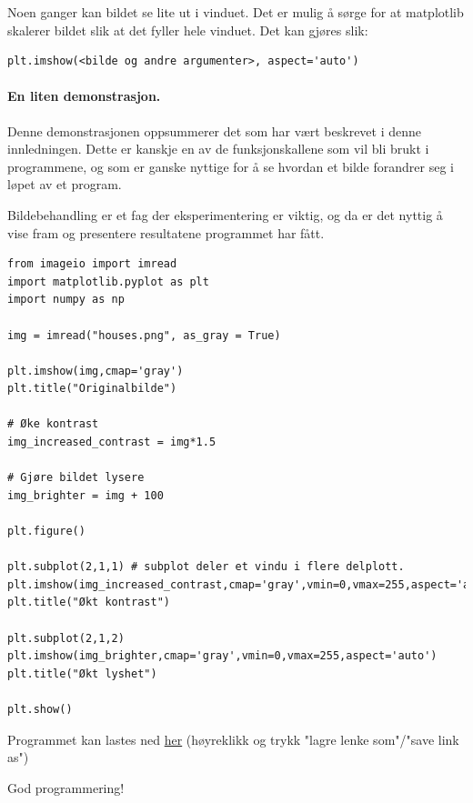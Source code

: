 \documentclass[%
oneside,                 %
final,                   %
10pt]{article}
\begin{document}
\vspace{3mm}


Noen ganger kan bildet se lite ut i vinduet. Det er mulig å sørge for at matplotlib skalerer bildet slik at det fyller hele vinduet. Det kan gjøres slik:
\begin{verbatim}
plt.imshow(<bilde og andre argumenter>, aspect='auto')
\end{verbatim}
\paragraph{En liten demonstrasjon.}
\label{subsec:demo}
Denne demonstrasjonen oppsummerer det som har vært beskrevet i denne innledningen. Dette er kanskje en av de funksjonskallene som vil bli brukt i programmene, og som er ganske nyttige
for å se hvordan et bilde forandrer seg i løpet av et program.

Bildebehandling er et fag der eksperimentering er viktig, og da er det nyttig å vise fram og presentere resultatene programmet har fått.

\begin{verbatim}
from imageio import imread
import matplotlib.pyplot as plt
import numpy as np

img = imread("houses.png", as_gray = True)

plt.imshow(img,cmap='gray')
plt.title("Originalbilde")

# Øke kontrast
img_increased_contrast = img*1.5

# Gjøre bildet lysere
img_brighter = img + 100

plt.figure()

plt.subplot(2,1,1) # subplot deler et vindu i flere delplott.
plt.imshow(img_increased_contrast,cmap='gray',vmin=0,vmax=255,aspect='auto')
plt.title("Økt kontrast")

plt.subplot(2,1,2)
plt.imshow(img_brighter,cmap='gray',vmin=0,vmax=255,aspect='auto')
plt.title("Økt lyshet")

plt.show()
\end{verbatim}
Programmet kan lastes ned \href{{https://github.com/krisbhei/INF2310/raw/master/Programmering/Python/demo.py}}{her} (høyreklikk og trykk "lagre lenke som"/"save link as")

God programmering!



\end{document}
